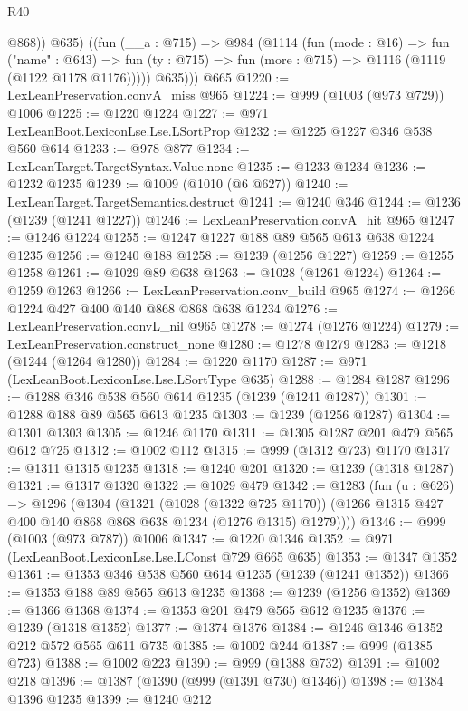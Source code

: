 \begin{lexlean}{R40}
\begin{coremodule}
            @868))
          @635)
        ((fun (__a : @715) =>
        @984
          (@1114
            (fun (mode : @16) =>
            fun ("name" : @643) =>
            fun (ty : @715) => fun (more : @715) => @1116 (@1119 (@1122 @1178 @1176)))))
          @635)))
    @665
@1220 := LexLeanPreservation.convA_miss @965
@1224 := @999 (@1003 (@973 @729)) @1006
@1225 := @1220 @1224
@1227 := @971 LexLeanBoot.LexiconLse.Lse.LSortProp
@1232 := @1225 @1227 @346 @538 @560 @614
@1233 := @978 @877
@1234 := LexLeanTarget.TargetSyntax.Value.none
@1235 := @1233 @1234
@1236 := @1232 @1235
@1239 := @1009 (@1010 (@6 @627))
@1240 := LexLeanTarget.TargetSemantics.destruct
@1241 := @1240 @346
@1244 := @1236 (@1239 (@1241 @1227))
@1246 := LexLeanPreservation.convA_hit @965
@1247 := @1246 @1224
@1255 := @1247 @1227 @188 @89 @565 @613 @638 @1224 @1235
@1256 := @1240 @188
@1258 := @1239 (@1256 @1227)
@1259 := @1255 @1258
@1261 := @1029 @89 @638
@1263 := @1028 (@1261 @1224)
@1264 := @1259 @1263
@1266 := LexLeanPreservation.conv_build @965
@1274 := @1266 @1224 @427 @400 @140 @868 @868 @638 @1234
@1276 := LexLeanPreservation.convL_nil @965
@1278 := @1274 (@1276 @1224)
@1279 := LexLeanPreservation.construct_none
@1280 := @1278 @1279
@1283 := @1218 (@1244 (@1264 @1280))
@1284 := @1220 @1170
@1287 := @971 (LexLeanBoot.LexiconLse.Lse.LSortType @635)
@1288 := @1284 @1287
@1296 := @1288 @346 @538 @560 @614 @1235 (@1239 (@1241 @1287))
@1301 := @1288 @188 @89 @565 @613 @1235
@1303 := @1239 (@1256 @1287)
@1304 := @1301 @1303
@1305 := @1246 @1170
@1311 := @1305 @1287 @201 @479 @565 @612 @725
@1312 := @1002 @112
@1315 := @999 (@1312 @723) @1170
@1317 := @1311 @1315 @1235
@1318 := @1240 @201
@1320 := @1239 (@1318 @1287)
@1321 := @1317 @1320
@1322 := @1029 @479
@1342 := @1283
    (fun (u : @626) =>
    @1296
      (@1304
        (@1321
          (@1028 (@1322 @725 @1170))
          (@1266 @1315 @427 @400 @140 @868 @868 @638 @1234 (@1276 @1315) @1279))))
@1346 := @999 (@1003 (@973 @787)) @1006
@1347 := @1220 @1346
@1352 := @971 (LexLeanBoot.LexiconLse.Lse.LConst @729 @665 @635)
@1353 := @1347 @1352
@1361 := @1353 @346 @538 @560 @614 @1235 (@1239 (@1241 @1352))
@1366 := @1353 @188 @89 @565 @613 @1235
@1368 := @1239 (@1256 @1352)
@1369 := @1366 @1368
@1374 := @1353 @201 @479 @565 @612 @1235
@1376 := @1239 (@1318 @1352)
@1377 := @1374 @1376
@1384 := @1246 @1346 @1352 @212 @572 @565 @611 @735
@1385 := @1002 @244
@1387 := @999 (@1385 @723)
@1388 := @1002 @223
@1390 := @999 (@1388 @732)
@1391 := @1002 @218
@1396 := @1387 (@1390 (@999 (@1391 @730) @1346))
@1398 := @1384 @1396 @1235
@1399 := @1240 @212

\end{coremodule}
\end{lexlean}
